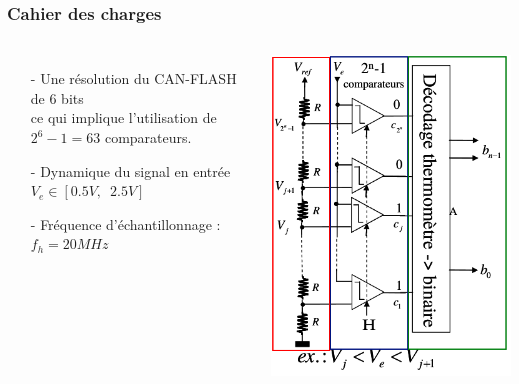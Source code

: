\documentclass{beamer}
\begin{document}
\begin{frame}
\frametitle{Cahier des charges}

\begin{columns}[T]
  \begin{itemize}
    \item[-] Une r\'esolution du CAN-FLASH de 6 bits\\ce qui implique l'utilisation de $2^{6} -1 = 63 $ comparateurs.
    \item[-] Dynamique du signal en entr\'ee $V_e \in [0.5 V,\phantom{2} 2.5V]$
    \item[-] Fr\'equence d'\'echantillonnage : $f_h = 20 MHz $
  \end{itemize}

  \hspace*{-0.5cm}
  \includegraphics[width=0.9\linewidth]{schema_global_charges.png}
\end{columns}

\end{frame}

\end{document}
